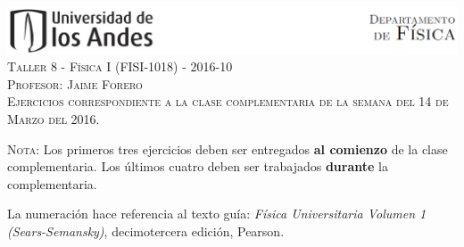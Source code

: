 \documentclass[letterpaper,10pt,onecolumn]{article}
\begin{document}
\begin{center}


\includegraphics[width=490pt]{header.png}\\[0.5cm]

\textsc{\LARGE Taller 8 - F\'isica I (FISI-1018) - 2016-10}\\[0.5cm]

\textsc{\Large{Profesor: Jaime Forero}} \\[0.5cm]

\noindent\textsc{Ejercicios correspondiente a la clase complementaria de la semana del 14 de Marzo del 2016.}\\[0.5cm]
\end{center}

\noindent\textsc{Nota:} 
Los primeros tres ejercicios deben ser
entregados {\bf al comienzo} de la clase complementaria. Los \'ultimos
cuatro deben ser trabajados {\bf durante} la complementaria. 

La numeraci\'on
hace referencia al texto gu\'ia: \textit{F\'isica Universitaria Volumen
  1 (Sears-Semansky)}, decimotercera edici\'on, Pearson.
\end{document}
